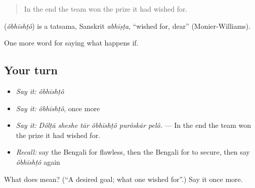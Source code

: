 \begin{quote}
In the end the team won the prize it had wished for.
\end{quote}

\begin{cousinweb}
\textbf{} (\emph{ôbhīshṭô}) is a tatsama, Sanskrit \emph{abhīṣṭa}, \textquotedblleft{}wished for, dear\textquotedblright{} (Monier-Williams).
\end{cousinweb}

\begin{grammarlens}[title={What you've built}]
One more word for saying what happens if.
\end{grammarlens}

\subsection*{Your turn}
\begin{itemize}
\raggedright
  \item \emph{Say it:} \emph{ôbhīshṭô}
  \item \emph{Say it:} \emph{ôbhīshṭô}, once more
  \item \emph{Say it:} \emph{Dôlṭā sheshe tār ôbhīshṭô purôskār pelô.} — In the end the team won the prize it had wished for.
  \item \emph{Recall:} say the Bengali for flawless, then the Bengali for to secure, then say \emph{ôbhīshṭô} again
\end{itemize}

\begin{tcolorbox}[breakable,colback=teal!4,colframe=teal!35!black,title={Before you move on}]
What does  mean? (\textquotedblleft{}A desired goal; what one wished for\textquotedblright{}.) Say it once more.
\end{tcolorbox}
